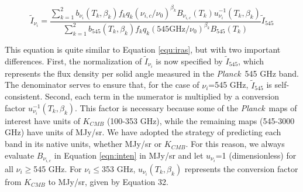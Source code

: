 \documentclass{emulateapj}
\newcommand{\PLANCK}{{\it Planck}}
\begin{document}
\begin{equation}
\label{eqn:inten}
\tilde{I}_{\nu_i} = \frac{\sum\limits_{k=1}^{2} b_{\nu_i}(T_k, \beta_k) f_k q_k (\nu_{i,c}/\nu_0)^{\beta_k} B_{\nu_{i,c}}(T_k) u_{\nu_i}^{-1}(T_k, \beta_k)}{\sum\limits_{k=1}^{2} b_{545}(T_k, \beta_k) f_k q_k (545 \textrm{GHz}/\nu_0)^{\beta_k} B_{545}(T_k)}\tilde{I}_{545}
\end{equation}

This equation is quite similar to Equation \ref{equ:iras}, but with two 
important differences. First, the normalization of $\tilde{I}_{\nu_i}$ is now 
specified by $\tilde{I}_{545}$, which represents the flux density per solid
angle measured in the \PLANCK~545 GHz band. The denominator serves to ensure 
that, for the case of $\nu_i$=545 GHz, $\tilde{I}_{545}$ is self-consistent. 
Second, each term in the numerator is multiplied by a conversion factor 
$u_{\nu_i}^{-1}(T_k, \beta_k)$. This factor is necessary because some of the 
\PLANCK~maps of interest have units of $K_{CMB}$ (100-353 GHz), while the
remaining maps (545-3000 GHz) have units of MJy/sr. We have adopted the 
strategy of predicting each band in its native units, whether MJy/sr or 
$K_{CMB}$. For this reason, we always evaluate $B_{\nu_{i,c}}$ in Equation 
\ref{eqn:inten} in MJy/sr and let $u_{\nu_i}$=1 (dimensionless) for all 
$\nu_i$$\ge$545 GHz. For $\nu_i$$\le$353 GHz, $u_{\nu_i}(T_k, \beta_k)$ 
represents the conversion factor from $K_{CMB}$ to MJy/sr, given by 
\cite{planckresponse} Equation 32.



\end{document}
